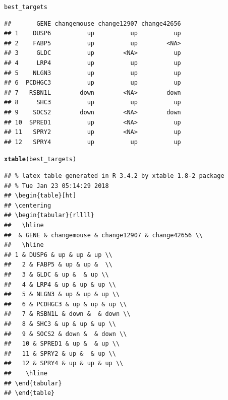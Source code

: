 \documentclass{article}\usepackage[]{graphicx}\usepackage[]{color}
\makeatletter
\newcommand{\hlstd}[1]{\textcolor[rgb]{0.345,0.345,0.345}{#1}}%
\newcommand{\hlkwd}[1]{\textcolor[rgb]{0.737,0.353,0.396}{\textbf{#1}}}%
\newenvironment{kframe}{%
 \def\at@end@of@kframe{}%
 \ifinner\ifhmode%
  \def\at@end@of@kframe{\end{minipage}}%
  \begin{minipage}{\columnwidth}%
 \fi\fi%
 \def\FrameCommand##1{\hskip\@totalleftmargin \hskip-\fboxsep
 \colorbox{shadecolor}{##1}\hskip-\fboxsep
     \hskip-\linewidth \hskip-\@totalleftmargin \hskip\columnwidth}%
 \MakeFramed {\advance\hsize-\width
   \@totalleftmargin\z@ \linewidth\hsize
   \@setminipage}}%
 {\par\unskip\endMakeFramed%
 \at@end@of@kframe}
\newenvironment{knitrout}{}{} %
\makeatother
\begin{document}
\begin{knitrout}
\begin{kframe}
\begin{alltt}
\hlstd{best_targets}
\end{alltt}
\begin{verbatim}
##       GENE changemouse change12907 change42656
## 1    DUSP6          up          up          up
## 2    FABP5          up          up        <NA>
## 3     GLDC          up        <NA>          up
## 4     LRP4          up          up          up
## 5    NLGN3          up          up          up
## 6  PCDHGC3          up          up          up
## 7   RSBN1L        down        <NA>        down
## 8     SHC3          up          up          up
## 9    SOCS2        down        <NA>        down
## 10  SPRED1          up        <NA>          up
## 11   SPRY2          up        <NA>          up
## 12   SPRY4          up          up          up
\end{verbatim}
\begin{alltt}
\hlkwd{xtable}\hlstd{(best_targets)}
\end{alltt}
\begin{verbatim}
## % latex table generated in R 3.4.2 by xtable 1.8-2 package
## % Tue Jan 23 05:14:29 2018
## \begin{table}[ht]
## \centering
## \begin{tabular}{rllll}
##   \hline
##  & GENE & changemouse & change12907 & change42656 \\ 
##   \hline
## 1 & DUSP6 & up & up & up \\ 
##   2 & FABP5 & up & up &  \\ 
##   3 & GLDC & up &  & up \\ 
##   4 & LRP4 & up & up & up \\ 
##   5 & NLGN3 & up & up & up \\ 
##   6 & PCDHGC3 & up & up & up \\ 
##   7 & RSBN1L & down &  & down \\ 
##   8 & SHC3 & up & up & up \\ 
##   9 & SOCS2 & down &  & down \\ 
##   10 & SPRED1 & up &  & up \\ 
##   11 & SPRY2 & up &  & up \\ 
##   12 & SPRY4 & up & up & up \\ 
##    \hline
## \end{tabular}
## \end{table}
\end{verbatim}
\end{kframe}
\end{knitrout}
\end{document}
